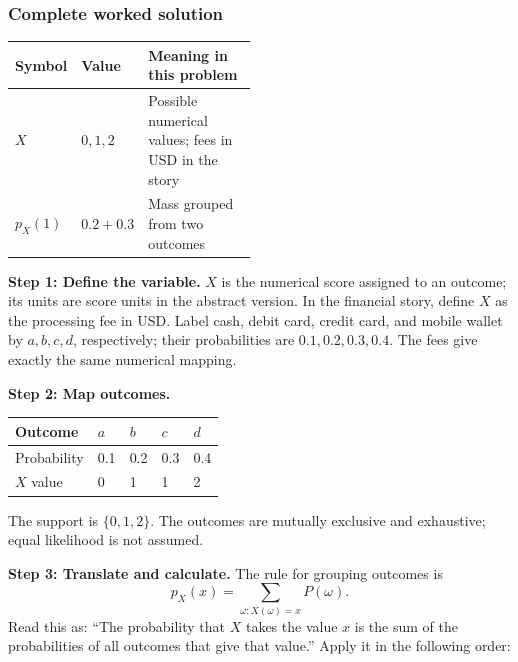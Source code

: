 \subsubsection*{Complete worked solution}
\begin{center}
\begin{tabular}{llp{0.48\linewidth}}
\toprule
Symbol & Value & Meaning in this problem \\ \midrule
$X$ & $0,1,2$ & Possible numerical values; fees in USD in the story \\
$p_X(1)$ & $0.2+0.3$ & Mass grouped from two outcomes \\
\bottomrule
\end{tabular}
\end{center}

\par\noindent\begin{minipage}{\linewidth}
\textbf{Step 1: Define the variable.} $X$ is the numerical score assigned to an outcome; its units are score units in the abstract version. In the financial story, define $X$ as the processing fee in USD. Label cash, debit card, credit card, and mobile wallet by $a,b,c,d$, respectively; their probabilities are $0.1,0.2,0.3,0.4$. The fees give exactly the same numerical mapping.
\end{minipage}\par\medskip
\par\noindent\begin{minipage}{\linewidth}
\textbf{Step 2: Map outcomes.} \begin{center}
\begin{tabular}{lllll}
\toprule
Outcome & $a$ & $b$ & $c$ & $d$ \\ \midrule
Probability & 0.1 & 0.2 & 0.3 & 0.4 \\
$X$ value & 0 & 1 & 1 & 2 \\
\bottomrule
\end{tabular}
\end{center}
The support is $\{0,1,2\}$. The outcomes are mutually exclusive and exhaustive; equal likelihood is not assumed.
\end{minipage}\par\medskip
\textbf{Step 3: Translate and calculate.} The rule for grouping outcomes is
\[
p_X(x)=\sum_{\omega:X(\omega)=x}P(\omega).
\]
Read this as: ``The probability that $X$ takes the value $x$ is the sum of the probabilities of all outcomes that give that value.'' Apply it in the following order:
